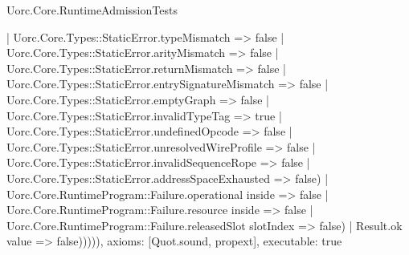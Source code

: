 \begin{lexlean}{Uorc.Core.RuntimeAdmissionTests}
\begin{semanticmodule}
{        | Uorc.Core.Types::StaticError.typeMismatch => false
        | Uorc.Core.Types::StaticError.arityMismatch => false
        | Uorc.Core.Types::StaticError.returnMismatch => false
        | Uorc.Core.Types::StaticError.entrySignatureMismatch => false
        | Uorc.Core.Types::StaticError.emptyGraph => false
        | Uorc.Core.Types::StaticError.invalidTypeTag => true
        | Uorc.Core.Types::StaticError.undefinedOpcode => false
        | Uorc.Core.Types::StaticError.unresolvedWireProfile => false
        | Uorc.Core.Types::StaticError.invalidSequenceRope => false
        | Uorc.Core.Types::StaticError.addressSpaceExhausted => false)
      | Uorc.Core.RuntimeProgram::Failure.operational inside => false
      | Uorc.Core.RuntimeProgram::Failure.resource inside => false
      | Uorc.Core.RuntimeProgram::Failure.releasedSlot slotIndex => false)
    | Result.ok value => false))))),
  axioms: [Quot.sound, propext],
  executable: true
}


\end{semanticmodule}
\end{lexlean}
